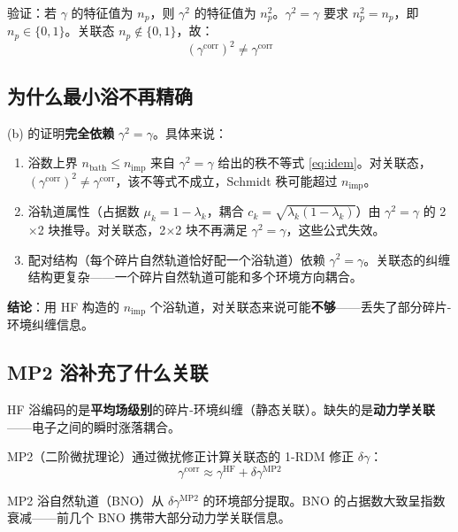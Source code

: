 \documentclass[11pt,a4paper]{article}
\begin{document}
验证：若 $\gamma$ 的特征值为 $n_p$，则 $\gamma^2$ 的特征值为 $n_p^2$。$\gamma^2 = \gamma$ 要求 $n_p^2 = n_p$，即 $n_p \in \{0, 1\}$。关联态 $n_p \notin \{0, 1\}$，故：
\begin{equation}
  \boxed{\;(\gamma^{\text{corr}})^2 \neq \gamma^{\text{corr}}\;}
\end{equation}

\subsection{为什么最小浴不再精确}

(b) 的证明\textbf{完全依赖} $\gamma^2 = \gamma$。具体来说：

\begin{enumerate}
  \item 浴数上界 $n_{\text{bath}} \leq n_{\text{imp}}$ 来自 $\gamma^2 = \gamma$ 给出的秩不等式 \eqref{eq:idem}。对关联态，$(\gamma^{\text{corr}})^2 \neq \gamma^{\text{corr}}$，该不等式不成立，Schmidt 秩可能超过 $n_{\text{imp}}$。

  \item 浴轨道属性（占据数 $\mu_k = 1-\lambda_k$，耦合 $c_k = \sqrt{\lambda_k(1-\lambda_k)}$）由 $\gamma^2 = \gamma$ 的 2$\times$2 块推导。对关联态，2$\times$2 块不再满足 $\gamma^2 = \gamma$，这些公式失效。

  \item 配对结构（每个碎片自然轨道恰好配一个浴轨道）依赖 $\gamma^2 = \gamma$。关联态的纠缠结构更复杂——一个碎片自然轨道可能和多个环境方向耦合。
\end{enumerate}

\textbf{结论}：用 HF 构造的 $n_{\text{imp}}$ 个浴轨道，对关联态来说可能\textbf{不够}——丢失了部分碎片-环境纠缠信息。

\subsection{MP2 浴补充了什么关联}

HF 浴编码的是\textbf{平均场级别}的碎片-环境纠缠（静态关联）。缺失的是\textbf{动力学关联}——电子之间的瞬时涨落耦合。

MP2（二阶微扰理论）通过微扰修正计算关联态的 1-RDM 修正 $\delta\gamma$：
\begin{equation}
  \gamma^{\text{corr}} \approx \gamma^{\text{HF}} + \delta\gamma^{\text{MP2}}
\end{equation}

MP2 浴自然轨道（BNO）从 $\delta\gamma^{\text{MP2}}$ 的环境部分提取。BNO 的占据数大致呈指数衰减——前几个 BNO 携带大部分动力学关联信息。
\end{document}
